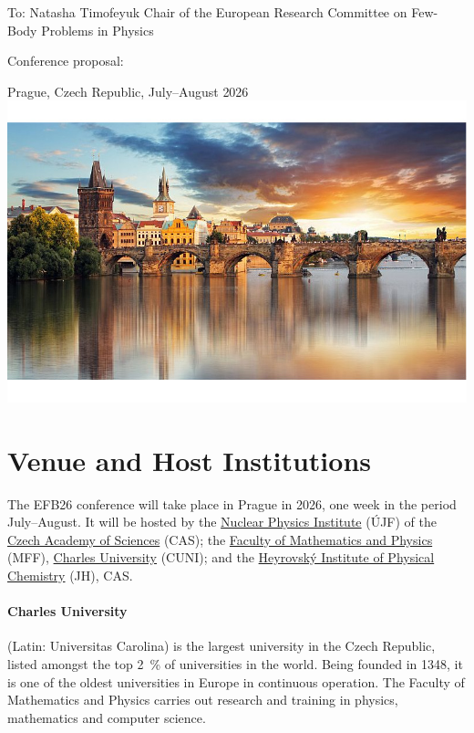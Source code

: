 \documentclass[12pt]{extarticle}
\begin{document}
\color{C0}


\noindent
To: Natasha Timofeyuk \newline
Chair of the European Research Committee \newline
on Few-Body Problems in Physics

\bigskip
\noindent
\doublespacing
  \noindent
  {\Large Conference proposal:}

  \bigskip
\doublespacing
{} \newline
{\Large Prague, Czech Republic, July--August 2026}\\
\includegraphics[width=1.0\textwidth]{Prague_foto_cut}

\onehalfspacing
\section*{Venue and Host Institutions}
\noindent
The EFB26 conference will take place in Prague in 2026, one week in
the period July--August. It will be hosted by the
\href{http://www.ujf.cas.cz/en/}{Nuclear Physics Institute} (ÚJF)
of the
\href{https://www.avcr.cz/en/}{Czech Academy of Sciences} (CAS); the
\href{https://www.mff.cuni.cz/en}{Faculty of Mathematics and
  Physics} (MFF), \href{https://cuni.cz/UKEN-1.html}{Charles
  University} (CUNI);
and the
\href{https://www.jh-inst.cas.cz/}{Heyrovský Institute of Physical
  Chemistry} (JH), CAS.

\paragraph{Charles University} (Latin: Universitas Carolina) is the
largest university in the Czech Republic, listed amongst the top
\qty{2}{\percent} of universities in the world. Being founded in 1348,
it is one of the oldest universities in Europe in continuous
operation. The Faculty of Mathematics and Physics carries out research
and training in physics, mathematics and computer science.
\end{document}
